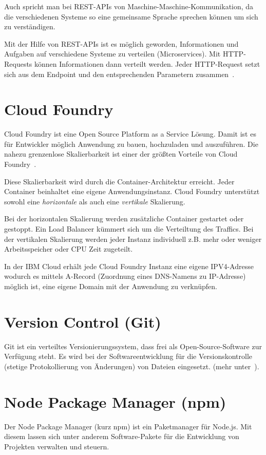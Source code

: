 Auch spricht man bei REST-APIs von Maschine-Maschine-Kommunikation, da die verschiedenen Systeme so eine gemeinsame
Sprache sprechen können um sich zu verständigen.

Mit der Hilfe von REST-APIs ist es möglich geworden, Informationen und Aufgaben auf verschiedene Systeme zu verteilen
(Microservices). Mit HTTP-Requests können Informationen dann verteilt werden. Jeder HTTP-Request setzt sich aus dem
Endpoint und den entsprechenden Parametern zusammen~\cite{online_grundlagen_rest}.

\section{Cloud Foundry}
Cloud Foundry ist eine Open Source Platform as a Service Lösung. Damit ist es für Entwickler möglich Anwendung zu bauen,
hochzuladen und auszuführen. Die nahezu grenzenlose Skalierbarkeit ist einer der größten Vorteile von Cloud
Foundry~\cite{book_grundlagen_cloudfoundry}.

Diese Skalierbarkeit wird durch die Container-Architektur erreicht. Jeder Container beinhaltet eine eigene
Anwendungsinstanz. Cloud Foundry unterstützt sowohl eine \textit{horizontale} als auch eine \textit{vertikale}
Skalierung.

Bei der horizontalen Skalierung werden zusätzliche Container gestartet oder gestoppt. Ein Load Balancer kümmert sich um
die Verteiltung des Traffics. Bei der vertikalen Skalierung werden jeder Instanz individuell z.B. mehr oder weniger
Arbeitsspeicher oder CPU Zeit zugeteilt.

In der IBM Cloud erhält jede Cloud Foundry Instanz eine eigene IPV4-Adresse wodurch es mittels A-Record (Zuordnung eines
DNS-Namens zu IP-Adresse) möglich ist, eine eigene Domain mit der Anwendung zu verknüpfen.

\section{Version Control (Git)}
Git ist ein verteiltes Versionierungssystem, dass frei als Open-Source-Software zur Verfügung steht. Es wird bei der
Softwareentwicklung für die Versionskontrolle (stetige Protokollierung von Änderungen) von Dateien eingesetzt. (mehr
unter~\cite{book_grundlagen_git}).

\section{Node Package Manager (npm)}
Der Node Package Manager (kurz npm) ist ein Paketmanager für Node.js. Mit diesem lassen sich unter anderem
Software-Pakete für die Entwicklung von Projekten verwalten und steuern.

